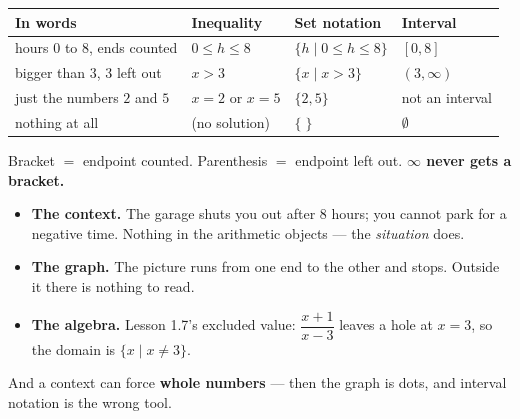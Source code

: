 \documentclass[aspectratio=169, 11pt]{beamer}
\begin{document}
\begin{frame}[t, plain]
  \renewcommand{\arraystretch}{1.4}
  \begin{tabularx}{\textwidth}{@{}X p{2.4cm} p{3.2cm} p{2.8cm}@{}}
    \textbf{In words} & \textbf{Inequality} & \textbf{Set notation} & \textbf{Interval} \\
    \hline
    hours $0$ to $8$, ends counted & $0 \le h \le 8$ & $\{h \mid 0 \le h \le 8\}$ & $[0,8]$ \\
    bigger than $3$, $3$ left out & $x > 3$ & $\{x \mid x > 3\}$ & $(3,\infty)$ \\
    just the numbers $2$ and $5$ & $x=2$ or $x=5$ & $\{2,5\}$ & not an interval \\
    nothing at all & (no solution) & $\{\;\}$ & $\emptyset$ \\
  \end{tabularx}
  \vspace{0.3cm}

  Bracket $=$ endpoint counted. Parenthesis $=$ endpoint left out. \textbf{$\infty$ never gets a
  bracket.}
\end{frame}

\begin{frame}[t, plain]
  \begin{itemize}
    \setlength{\itemsep}{0.3cm}
    \item \textbf{The context.} The garage shuts you out after 8 hours; you cannot park for a
          negative time. Nothing in the arithmetic objects --- the \emph{situation} does.
    \item \textbf{The graph.} The picture runs from one end to the other and stops. Outside it
          there is nothing to read.
    \item \textbf{The algebra.} Lesson 1.7's excluded value: $\dfrac{x+1}{x-3}$ leaves a hole at
          $x=3$, so the domain is $\{x \mid x \ne 3\}$.
  \end{itemize}
  \vspace{0.2cm}
  And a context can force \textbf{whole numbers} --- then the graph is dots, and interval notation
  is the wrong tool.
\end{frame}
\end{document}
